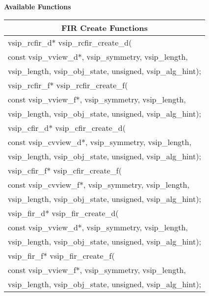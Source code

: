 \\\cvsiplh 
\\ \hspace*{.8cm} \vspace*{.1cm} \textbf{Available Functions }
\\ \hspace*{1.cm} {
\ttfamily
\begin{tabular}[H]{|l|}
\multicolumn{1}{c}{\rmfamily \bfseries FIR Create Functions\vspace{.1cm}}\\ \hline
vsip\_rcfir\_d* vsip\_rcfir\_create\_d(\\*\hspace{.6cm}const vsip\_vview\_d*, vsip\_symmetry, vsip\_length,\\*\hspace{.6cm}vsip\_length, vsip\_obj\_state, unsigned, vsip\_alg\_hint);\\
vsip\_rcfir\_f* vsip\_rcfir\_create\_f(\\*\hspace{.6cm}const vsip\_vview\_f*, vsip\_symmetry, vsip\_length,\\*\hspace{.6cm}vsip\_length, vsip\_obj\_state, unsigned, vsip\_alg\_hint);\\
vsip\_cfir\_d* vsip\_cfir\_create\_d(\\*\hspace{.6cm}const vsip\_cvview\_d*, vsip\_symmetry, vsip\_length,\\*\hspace{.6cm}vsip\_length, vsip\_obj\_state, unsigned, vsip\_alg\_hint);\\
vsip\_cfir\_f* vsip\_cfir\_create\_f(\\*\hspace{.6cm}const vsip\_cvview\_f*, vsip\_symmetry, vsip\_length,\\*\hspace{.6cm}vsip\_length, vsip\_obj\_state, unsigned, vsip\_alg\_hint);\\
vsip\_fir\_d* vsip\_fir\_create\_d(\\*\hspace{.6cm}const vsip\_vview\_d*, vsip\_symmetry, vsip\_length,\\*\hspace{.6cm}vsip\_length, vsip\_obj\_state, unsigned, vsip\_alg\_hint);\\
vsip\_fir\_f* vsip\_fir\_create\_f(\\*\hspace{.6cm}const vsip\_vview\_f*, vsip\_symmetry, vsip\_length,\\*\hspace{.6cm}vsip\_length, vsip\_obj\_state, unsigned, vsip\_alg\_hint);\\\hline
\end{tabular}\vspace{.1cm}
}
